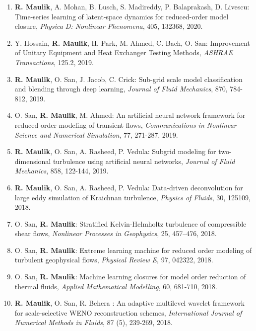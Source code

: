 \documentclass[letterpaper]{article}
\begin{document}
\begin{enumerate}
\item \textbf{R. Maulik}, A. Mohan, B. Lusch, S. Madireddy, P. Balaprakash, D. Livescu: Time-series learning of latent-space dynamics for reduced-order model closure, {\it Physica D: Nonlinear Phenomena}, 405, 132368, 2020. 

\item Y. Hossain, \textbf{R. Maulik}, H. Park, M. Ahmed, C. Bach, O. San: Improvement of Unitary Equipment and Heat Exchanger Testing Methods, {\it ASHRAE Transactions}, 125.2, 2019. 

\item \textbf{R. Maulik}, O. San, J. Jacob, C. Crick: Sub-grid scale model classification and blending through deep learning, {\it Journal of Fluid Mechanics}, 870, 784-812, 2019. 

\item O. San, \textbf{R. Maulik}, M. Ahmed: An artificial neural network framework for reduced order modeling of transient flows, {\it Communications in Nonlinear Science and Numerical Simulation}, 77, 271-287, 2019. 

\item \textbf{R. Maulik}, O. San, A. Rasheed, P. Vedula: Subgrid modeling for two-dimensional turbulence using artificial neural networks, {\it Journal of Fluid Mechanics}, 858, 122-144, 2019. 

\item \textbf{R. Maulik}, O. San, A. Rasheed, P. Vedula: Data-driven deconvolution for large eddy simulation of Kraichnan turbulence, {\it Physics of Fluids}, 30, 125109, 2018. 

\item O. San, \textbf{R. Maulik}: Stratified Kelvin-Helmholtz turbulence of compressible shear flows, {\it Nonlinear Processes in Geophysics}, 25, 457--476, 2018.

\item O. San, \textbf{R. Maulik}: Extreme learning machine for reduced order modeling of turbulent geophysical flows, {\it Physical Review E}, 97, 042322, 2018. 

\item O. San, \textbf{R. Maulik}: Machine learning closures for model order reduction of thermal fluids,  {\it Applied Mathematical Modelling}, 60, 681-710, 2018. 

\item \textbf{R. Maulik}, O. San, R. Behera : An adaptive multilevel wavelet framework for scale-selective WENO reconstruction schemes, {\it International Journal of Numerical Methods in Fluids}, 87 (5), 239-269, 2018. 


\end{enumerate}
\end{document}
